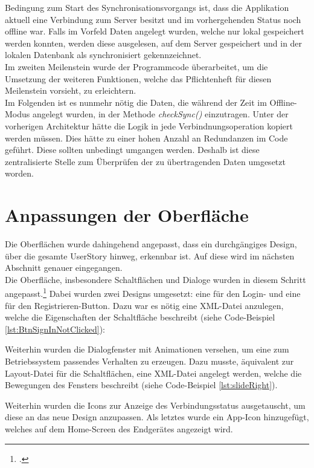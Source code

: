 Bedingung zum Start des Synchronisationsvorgangs ist, dass die Applikation aktuell eine Verbindung zum Server besitzt und im vorhergehenden Status noch offline war. Falls im Vorfeld Daten angelegt wurden, welche nur lokal gespeichert werden konnten, werden diese ausgelesen, auf dem Server gespeichert und in der lokalen Datenbank als synchronisiert gekennzeichnet.\\
Im zweiten Meilenstein wurde der Programmcode überarbeitet, um die Umsetzung der weiteren Funktionen, welche das Pflichtenheft für diesen Meilenstein vorsieht, zu erleichtern. \\
Im Folgenden ist es nunmehr nötig die Daten, die während der Zeit im Offline-Modus angelegt wurden, in der Methode \textit{checkSync()} einzutragen. Unter der vorherigen Architektur hätte die Logik in jede Verbindnungsoperation kopiert werden müssen. Dies hätte zu einer hohen Anzahl an Redundanzen im Code geführt. Diese sollten unbedingt umgangen werden. Deshalb ist diese zentralisierte Stelle zum Überprüfen der zu übertragenden Daten umgesetzt worden.
\section{Anpassungen der Oberfläche}
\label{sec:anpassungen-oberflaeche}
Die Oberflächen wurde dahingehend angepasst, dass ein durchgängiges Design, über die gesamte \gls{UserStory} hinweg, erkennbar ist. Auf diese wird im nächsten Abschnitt genauer eingegangen.\\ 
Die Oberfläche, insbesondere Schaltflächen und Dialoge wurden in diesem Schritt angepasst.\footcite{Android-Oberflaechen} Dabei wurden zwei Designs umgesetzt: eine für den Login- und eine für den Registrieren-Button. Dazu war es nötig eine \ac{XML}-Datei anzulegen, welche die Eigenschaften der Schaltfläche beschreibt (siehe Code-Beispiel \ref{lst:BtnSignInNotClicked}):


Weiterhin wurden die Dialogfenster mit Animationen versehen, um eine zum Betriebssystem passendes Verhalten zu erzeugen. Dazu musste, äquivalent zur Layout-Datei für die Schaltflächen, eine \ac{XML}-Datei angelegt werden, welche die Bewegungen des Fensters beschreibt (siehe Code-Beispiel \ref{lst:slideRight}).

Weiterhin wurden die Icons zur Anzeige des Verbindungsstatus ausgetauscht, um diese an das neue Design anzupassen. Als letztes wurde ein \gls{App}-Icon hinzugefügt, welches auf dem Home-Screen des Endgerätes angezeigt wird. 
